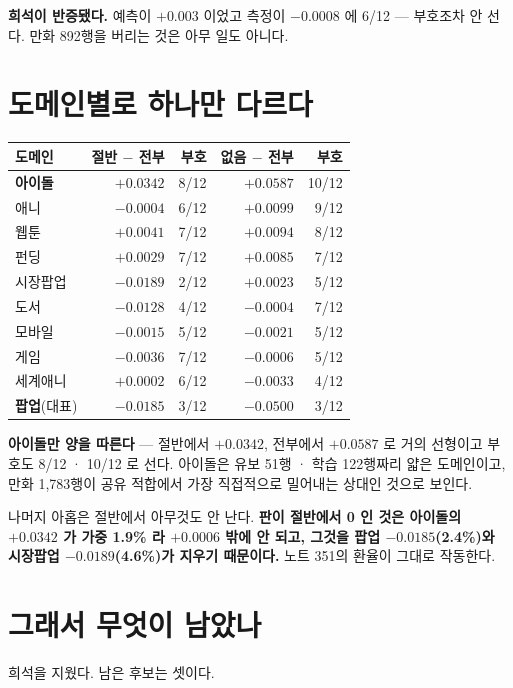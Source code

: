 \documentclass[11pt]{article}
\begin{document}
\textbf{희석이 반증됐다.} 예측이 $+0.003$ 이었고 측정이 $-0.0008$ 에
6/12 --- 부호조차 안 선다. 만화 892행을 버리는 것은 아무 일도 아니다.

\section{도메인별로 하나만 다르다}

\begin{center}
\begin{tabular}{lrrrr}
\hline
도메인 & 절반 $-$ 전부 & 부호 & 없음 $-$ 전부 & 부호 \\
\hline
\textbf{아이돌} & $\mathbf{+0.0342}$ & 8/12 & $\mathbf{+0.0587}$ & 10/12 \\
애니     & $-0.0004$ & 6/12 & $+0.0099$ & 9/12 \\
웹툰     & $+0.0041$ & 7/12 & $+0.0094$ & 8/12 \\
펀딩     & $+0.0029$ & 7/12 & $+0.0085$ & 7/12 \\
시장팝업 & $-0.0189$ & 2/12 & $+0.0023$ & 5/12 \\
도서     & $-0.0128$ & 4/12 & $-0.0004$ & 7/12 \\
모바일   & $-0.0015$ & 5/12 & $-0.0021$ & 5/12 \\
게임     & $-0.0036$ & 7/12 & $-0.0006$ & 5/12 \\
세계애니 & $+0.0002$ & 6/12 & $-0.0033$ & 4/12 \\
\textbf{팝업}(대표) & $-0.0185$ & 3/12 & $-0.0500$ & 3/12 \\
\hline
\end{tabular}
\end{center}

\textbf{아이돌만 양을 따른다} --- 절반에서 $+0.0342$, 전부에서 $+0.0587$
로 거의 선형이고 부호도 8/12 · 10/12 로 선다. 아이돌은 유보 51행 ·
학습 122행짜리 얇은 도메인이고, 만화 1,783행이 공유 적합에서 가장
직접적으로 밀어내는 상대인 것으로 보인다.

나머지 아홉은 절반에서 아무것도 안 난다. \textbf{판이 절반에서 0 인 것은
아이돌의 $+0.0342$ 가 가중 1.9\% 라 $+0.0006$ 밖에 안 되고, 그것을
팝업 $-0.0185$(2.4\%)와 시장팝업 $-0.0189$(4.6\%)가 지우기 때문이다.}
노트 351의 환율이 그대로 작동한다.

\section{그래서 무엇이 남았나}

희석을 지웠다. 남은 후보는 셋이다.
\end{document}
